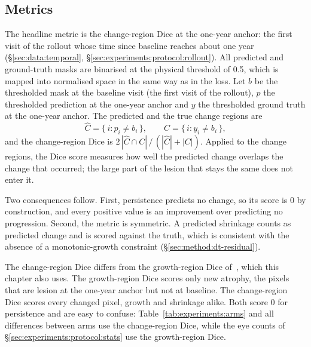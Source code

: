 \subsection{Metrics}
\label{sec:experiments:protocol:metrics}

The headline metric is the change-region Dice at the one-year anchor: the
first visit of the rollout whose time since baseline reaches about one year
(\S\ref{sec:data:temporal}, \S\ref{sec:experiments:protocol:rollout}).
All predicted and ground-truth masks are binarised at the physical threshold of
0.5, which is mapped into normalised space in the same way as in the loss. Let $b$
be the thresholded mask at the baseline visit (the first visit of the
rollout), $p$ the thresholded prediction at the one-year anchor and $y$ the
thresholded ground truth at the one-year anchor. The predicted and the true change
regions are
\begin{equation}
  \hat{C} = \{\, i : p_i \neq b_i \,\}, \qquad
  C = \{\, i : y_i \neq b_i \,\},
  \label{eq:experiments:change-region}
\end{equation}
and the change-region Dice is $2\,|\hat{C} \cap C| \,/\, (|\hat{C}| + |C|)$.
Applied to the change regions, the Dice score measures how well the
predicted change overlaps the change that occurred; the large part of the
lesion that stays the same does not enter it.

Two consequences follow. First, persistence predicts no change, so its
score is 0 by construction, and every positive value is an improvement over
predicting no progression. Second, the metric is symmetric. A predicted
shrinkage counts as predicted change and is scored against the truth, which
is consistent with the absence of a monotonic-growth constraint
(\S\ref{sec:method:dt-residual}).

The change-region Dice differs from the growth-region Dice
of~\citet{Mai2024}, which this chapter also uses. The growth-region Dice
scores only new atrophy, the pixels that are lesion at the one-year anchor but not
at baseline. The change-region Dice scores every changed pixel, growth and
shrinkage alike. Both score 0 for persistence and are easy to confuse:
Table~\ref{tab:experiments:arms} and all differences between arms use the
change-region Dice, while the eye counts of
\S\ref{sec:experiments:protocol:stats} use the growth-region Dice.

